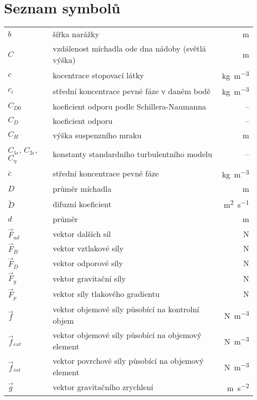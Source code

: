 \chapter*{Seznam symbolů}

\renewcommand\arraystretch{1.5}
\begin{tabularx}{\textwidth}{@{}p{2.5cm} X r@{}}

$b$ & šířka narážky & \si{\meter} \\
$C$ & vzdálenost míchadla ode dna nádoby (světlá výška) & \si{\meter} \\
$c$ & kocentrace stopovací látky & \si{\kilogram\per\cubic\meter} \\
$c_{i}$ & střední koncentrace pevné fáze v daném bodě & \si{\kilogram\per\cubic\meter} \\
$C_{D0}$ & koeficient odporu podle Schillera-Naumanna & -- \\ 
$C_{D}$ & koeficient odporu &  -- \\
$C_{H}$ & výška suspenzního mraku & \si{\meter} \\
$C_{1\epsilon}$, $C_{2\epsilon}$, $C_{\eta}$ & konstanty standardního \keps{} turbulentního modelu & -- \\
$\bar{c}$ & střední koncentrace pevné fáze & \si{\kilogram\per\cubic\meter} \\
$D$ & průměr míchadla & \si{\meter} \\
$\tilde{D}$ & difuzní koeficient & \si{\meter\squared\per\second} \\
$d$ & průměr & \si{\meter} \\
$\vec{F}_{ad}$ & vektor dalších sil & \si{\newton} \\
$\vec{F}_{B}$ & vektor vztlakové síly & \si{\newton} \\
$\vec{F}_{D}$ & vektor odporové síly & \si{\newton} \\
$\vec{F}_{g}$ & vektor gravitační síly & \si{\newton} \\
$\vec{F}_{p}$ & vektor síly tlakového gradientu & \si{\newton} \\
$\vec{f}$ & vektor objemové síly působící na kontrolní objem & \si{\newton\per\cubic\meter} \\
$\vec{f}_{ext}$ & vektor objemové síly působící na objemový element & \si{\newton\per\cubic\meter} \\
$\vec{f}_{int}$ & vektor povrchové síly působící na objemový element & \si{\newton\per\cubic\meter} \\
$\vec{g}$ & vektor gravitačního zrychlení & \si{\meter\per\second\squared} \\

\end{tabularx}
